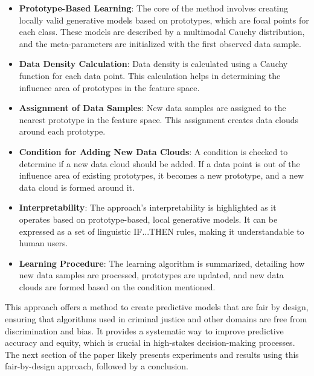 \documentclass{article}
\begin{document}
\begin{itemize}
  \item \textbf{Prototype-Based Learning}: The core of the method involves creating locally valid generative models based on prototypes, which are focal points for each class. These models are described by a multimodal Cauchy distribution, and the meta-parameters are initialized with the first observed data sample.
  
  \item \textbf{Data Density Calculation}: Data density is calculated using a Cauchy function for each data point. This calculation helps in determining the influence area of prototypes in the feature space.
  
  \item \textbf{Assignment of Data Samples}: New data samples are assigned to the nearest prototype in the feature space. This assignment creates data clouds around each prototype.
  
  \item \textbf{Condition for Adding New Data Clouds}: A condition is checked to determine if a new data cloud should be added. If a data point is out of the influence area of existing prototypes, it becomes a new prototype, and a new data cloud is formed around it.
  
  \item \textbf{Interpretability}: The approach's interpretability is highlighted as it operates based on prototype-based, local generative models. It can be expressed as a set of linguistic IF...THEN rules, making it understandable to human users.
  
  \item \textbf{Learning Procedure}: The learning algorithm is summarized, detailing how new data samples are processed, prototypes are updated, and new data clouds are formed based on the condition mentioned.
\end{itemize}

This approach offers a method to create predictive models that are fair by design, ensuring that algorithms used in criminal justice and other domains are free from discrimination and bias. It provides a systematic way to improve predictive accuracy and equity, which is crucial in high-stakes decision-making processes. The next section of the paper likely presents experiments and results using this fair-by-design approach, followed by a conclusion.

\newpage
\end{document}
